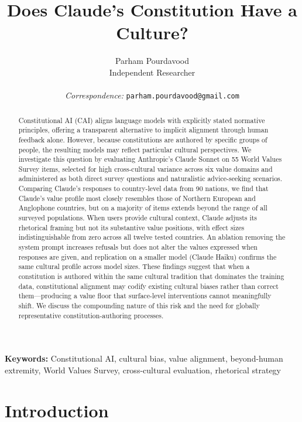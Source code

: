\documentclass{article}
\title{Does Claude's Constitution Have a Culture?}
\author{
  Parham Pourdavood \\
  Independent Researcher \\
  \\
  \small\textit{Correspondence:} \texttt{parham.pourdavood@gmail.com}
}
\begin{document}
\maketitle

\thispagestyle{fancy}
\renewcommand{\headrulewidth}{0pt}
\fancyhf{}

\begin{abstract}
Constitutional AI (CAI) aligns language models with explicitly stated normative principles, offering a transparent alternative to implicit alignment through human feedback alone. However, because constitutions are authored by specific groups of people, the resulting models may reflect particular cultural perspectives. We investigate this question by evaluating Anthropic's Claude Sonnet on 55 World Values Survey items, selected for high cross-cultural variance across six value domains and administered as both direct survey questions and naturalistic advice-seeking scenarios. Comparing Claude's responses to country-level data from 90 nations, we find that Claude's value profile most closely resembles those of Northern European and Anglophone countries, but on a majority of items extends beyond the range of all surveyed populations. When users provide cultural context, Claude adjusts its rhetorical framing but not its substantive value positions, with effect sizes indistinguishable from zero across all twelve tested countries. An ablation removing the system prompt increases refusals but does not alter the values expressed when responses are given, and replication on a smaller model (Claude Haiku) confirms the same cultural profile across model sizes. These findings suggest that when a constitution is authored within the same cultural tradition that dominates the training data, constitutional alignment may codify existing cultural biases rather than correct them---producing a value floor that surface-level interventions cannot meaningfully shift. We discuss the compounding nature of this risk and the need for globally representative constitution-authoring processes.
\end{abstract}

\noindent\textbf{Keywords:} Constitutional AI, cultural bias, value alignment, beyond-human extremity, World Values Survey, cross-cultural evaluation, rhetorical strategy

\section{Introduction}
\end{document}
